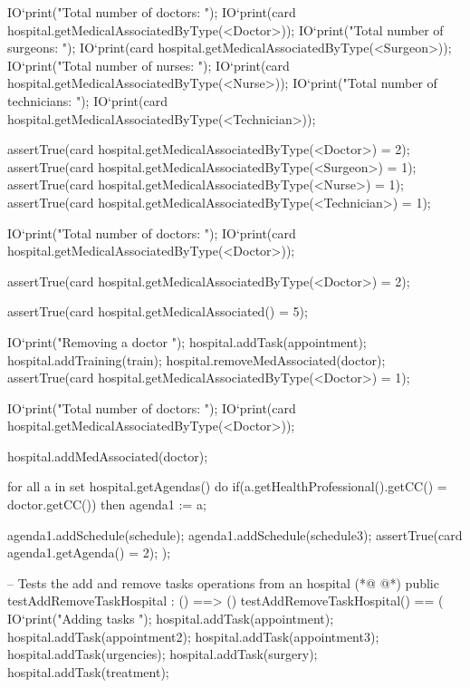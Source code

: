 \begin{vdmpp}[breaklines=true]
     IO`print("\n Total number of doctors: ");
     IO`print(card hospital.getMedicalAssociatedByType(<Doctor>));
     IO`print("\n Total number of surgeons: ");
     IO`print(card hospital.getMedicalAssociatedByType(<Surgeon>));
     IO`print("\n Total number of nurses: ");
     IO`print(card hospital.getMedicalAssociatedByType(<Nurse>));
     IO`print("\n Total number of technicians: ");
     IO`print(card hospital.getMedicalAssociatedByType(<Technician>));
     
     assertTrue(card hospital.getMedicalAssociatedByType(<Doctor>) = 2);
     assertTrue(card hospital.getMedicalAssociatedByType(<Surgeon>) = 1);
     assertTrue(card hospital.getMedicalAssociatedByType(<Nurse>) = 1);
     assertTrue(card hospital.getMedicalAssociatedByType(<Technician>) = 1);
     
     IO`print("\n Total number of doctors: ");
     IO`print(card hospital.getMedicalAssociatedByType(<Doctor>));
     
     assertTrue(card hospital.getMedicalAssociatedByType(<Doctor>) = 2);
     
     assertTrue(card hospital.getMedicalAssociated() = 5);
     
     IO`print("\n Removing a doctor \n");
     hospital.addTask(appointment);
     hospital.addTraining(train);
     hospital.removeMedAssociated(doctor);
     assertTrue(card hospital.getMedicalAssociatedByType(<Doctor>) = 1); 
     
     IO`print("\n Total number of doctors: ");
     IO`print(card hospital.getMedicalAssociatedByType(<Doctor>));
     
     hospital.addMedAssociated(doctor);
     
     for all a in set hospital.getAgendas() do
      if(a.getHealthProfessional().getCC() = doctor.getCC())
       then agenda1 := a;
     
     agenda1.addSchedule(schedule);
     agenda1.addSchedule(schedule3);
     assertTrue(card agenda1.getAgenda() = 2);       
  );
  
  -- Tests the add and remove tasks operations from an hospital
(*@
\label{testAddRemoveTaskHospital:187}
@*)
    public testAddRemoveTaskHospital : () ==> ()
    testAddRemoveTaskHospital() == (
     IO`print("\n Adding tasks \n");       
      hospital.addTask(appointment);
      hospital.addTask(appointment2);
      hospital.addTask(appointment3);
      hospital.addTask(urgencies);
      hospital.addTask(surgery);
      hospital.addTask(treatment);
      

\end{vdmpp}
